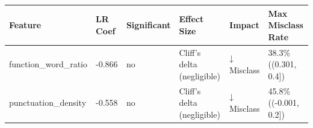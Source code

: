 \begin{tabular}{llllll}
\toprule
Feature & LR Coef & Significant & Effect Size & Impact & Max Misclass Rate \\
\midrule
function\_word\_ratio & -0.866 & no & Cliff's delta (negligible) & ↓ Misclass & 38.3\% ((0.301, 0.4]) \\
punctuation\_density & -0.558 & no & Cliff's delta (negligible) & ↓ Misclass & 45.8\% ((-0.001, 0.2]) \\
\bottomrule
\end{tabular}
